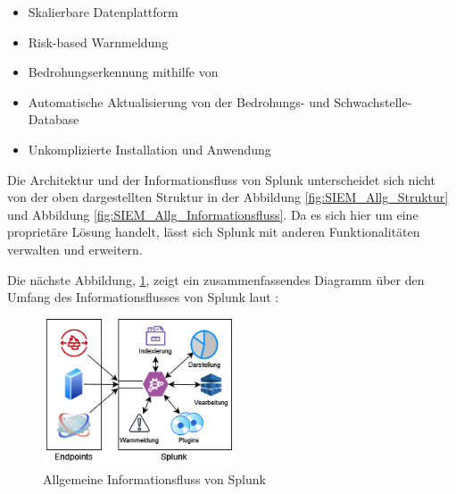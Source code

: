 \begin{itemize}[noitemsep]
   \item Skalierbare Datenplattform
   \item Risk-based Warnmeldung
   \item Bedrohungserkennung mithilfe von 
   \item Automatische Aktualisierung von der Bedrohungs- und Schwachstelle-Database
   \item Unkomplizierte Installation und Anwendung
\end{itemize}

Die Architektur und der Informationsfluss von Splunk unterscheidet sich nicht von der oben dargestellten Struktur in der Abbildung \ref{fig:SIEM_Allg_Struktur} und Abbildung \ref{fig:SIEM_Allg_Informationsfluss}. Da es sich hier um eine proprietäre Lösung handelt, lässt sich Splunk mit anderen Funktionalitäten verwalten und erweitern.

Die nächste Abbildung, \ref{fig:Allgemein_Splunk}, zeigt ein zusammenfassendes Diagramm über den Umfang des Informationsflusses von Splunk laut \cite{Splunk_platform}:


\begin{figure}[H]
   \centering
   \includegraphics[width=0.5\textwidth]{assets/Splunk.drawio.png}
   \caption[Allgemeine Informationsfluss von Splunk]
   {Allgemeine Informationsfluss von Splunk}
   \label{fig:Allgemein_Splunk}
   \centering
\end{figure}



